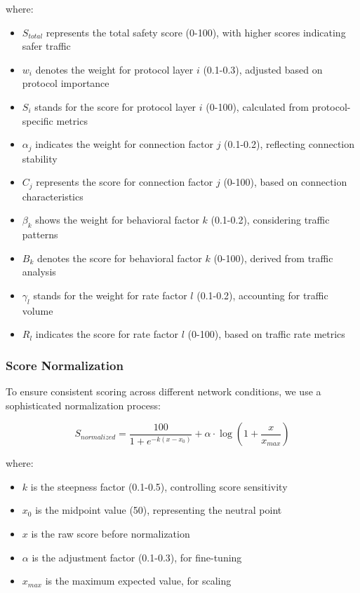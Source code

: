 \documentclass[conference]{IEEEtran}
\begin{document}
where:
\begin{itemize}[leftmargin=*]
    \item $S_{total}$ represents the total safety score (0-100), with higher scores indicating safer traffic
    \item $w_i$ denotes the weight for protocol layer $i$ (0.1-0.3), adjusted based on protocol importance
    \item $S_i$ stands for the score for protocol layer $i$ (0-100), calculated from protocol-specific metrics
    \item $\alpha_j$ indicates the weight for connection factor $j$ (0.1-0.2), reflecting connection stability
    \item $C_j$ represents the score for connection factor $j$ (0-100), based on connection characteristics
    \item $\beta_k$ shows the weight for behavioral factor $k$ (0.1-0.2), considering traffic patterns
    \item $B_k$ denotes the score for behavioral factor $k$ (0-100), derived from traffic analysis
    \item $\gamma_l$ stands for the weight for rate factor $l$ (0.1-0.2), accounting for traffic volume
    \item $R_l$ indicates the score for rate factor $l$ (0-100), based on traffic rate metrics
\end{itemize}

\subsubsection{Score Normalization}
To ensure consistent scoring across different network conditions, we use a sophisticated normalization process:

\begin{equation}
S_{normalized} = \frac{100}{1 + e^{-k(x - x_0)}} + \alpha \cdot \log(1 + \frac{x}{x_{max}})
\end{equation}

where:
\begin{itemize}[leftmargin=*]
    \item $k$ is the steepness factor (0.1-0.5), controlling score sensitivity
    \item $x_0$ is the midpoint value (50), representing the neutral point
    \item $x$ is the raw score before normalization
    \item $\alpha$ is the adjustment factor (0.1-0.3), for fine-tuning
    \item $x_{max}$ is the maximum expected value, for scaling
\end{itemize}
\end{document}
